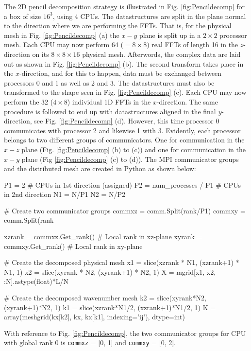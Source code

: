 \documentclass[11pt, oneside]{article}
\newcommand{\inpyth}{\lstinline[style=pythonstyle, basicstyle=\ttfamily]} %[]%
\begin{document}
The 2D pencil decomposition strategy is illustrated in Fig. \ref{fig:Pencildecomp} for a box of size $16^3$, using 4 CPUs. The datastructures are split in the plane normal to the direction where we are performing the FFTs. That is, for the physical mesh in Fig. \ref{fig:Pencildecomp} (a) the $x-y$ plane is split up in a $2\times2$ processor mesh. Each CPU may now perform 64 ($= 8 \times 8$) real FFTs of length 16 in the $z$-direction on its $8 \times 8 \times 16$ physical mesh. Afterwords, the complex data are laid out as shown in Fig. \ref{fig:Pencildecomp} (b). The second transform takes place in the $x$-direction, and for this to happen, data must be exchanged between processors 0 and 1 as well as 2 and 3. The datastructures must also be transformed to the shape seen in Fig. \ref{fig:Pencildecomp} (c). Each CPU may now perform the 32 ($4 \times 8$) individual 1D FFTs in the $x$-direction. The same procedure is followed to end up with datastructures aligned in the final $y$-direction, see Fig. \ref{fig:Pencildecomp} (d). However, this time processor 0 communicates with processor 2 and likewise 1 with 3. Evidently, each processor belongs to two different groups of communicators. One for communication in the $x-z$ plane (Fig. \ref{fig:Pencildecomp} (b) to (c)) and one for communication in the $x-y$ plane (Fig \ref{fig:Pencildecomp} (c) to (d)). The MPI communicator groups and the distributed mesh are created in Python as shown below:

\begin{minipage}{\linewidth}
\begin{python}
P1 = 2                     # CPUs in 1st direction (assigned)
P2 = num_processes / P1    # CPUs in 2nd direction
N1 = N/P1
N2 = N/P2

# Create two communicator groups
commxz = comm.Split(rank/P1)
commxy = comm.Split(rank%
    
xzrank = commxz.Get_rank() # Local rank in xz-plane
xyrank = commxy.Get_rank() # Local rank in xy-plane
    
# Create the decomposed physical mesh
x1 = slice(xzrank * N1, (xzrank+1) * N1, 1)
x2 = slice(xyrank * N2, (xyrank+1) * N2, 1)
X = mgrid[x1, x2, :N].astype(float)*L/N

# Create the decomposed wavenumber mesh
k2 = slice(xyrank*N2, (xyrank+1)*N2, 1)
k1 = slice(xzrank*N1/2, (xzrank+1)*N1/2, 1)
K = array(meshgrid(kx[k2], kx, kx[k1], indexing='ij'), dtype=int)
\end{python}
\end{minipage}
With reference to Fig. \ref{fig:Pencildecomp}, the two communicator groups for CPU with global rank 0 is \inpyth{commxz} = [0, 1] and \inpyth{commxy} = [0, 2].
\end{document}
